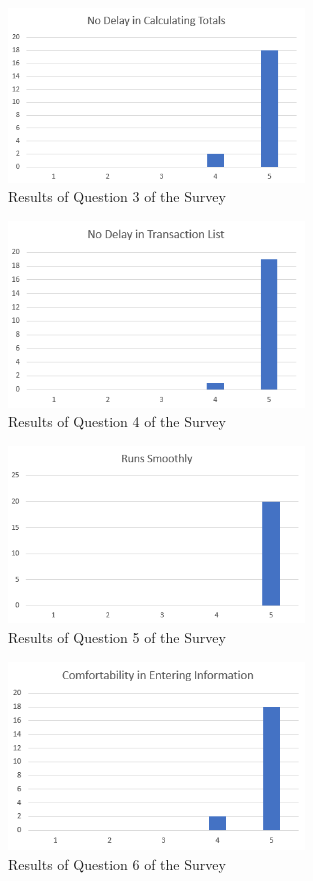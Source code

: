 \documentclass[12pt, titlepage]{article}
\begin{document}
\begin{figure}[h]
\centering
\includegraphics[width=0.7\textwidth]{Question3.png}
\caption{Results of Question 3 of the Survey}
\label{Q3}
\end{figure}

\begin{figure}[h]
\centering
\includegraphics[width=0.7\textwidth]{Question4.png}
\caption{Results of Question 4 of the Survey}
\label{Q4}
\end{figure}
\clearpage

\begin{figure}[h]
\centering
\includegraphics[width=0.7\textwidth]{Question5.png}
\caption{Results of Question 5 of the Survey}
\label{Q5}
\end{figure}

\begin{figure}[h]
\centering
\includegraphics[width=0.7\textwidth]{Question6.png}
\caption{Results of Question 6 of the Survey}
\label{Q6}
\end{figure}
\end{document}

